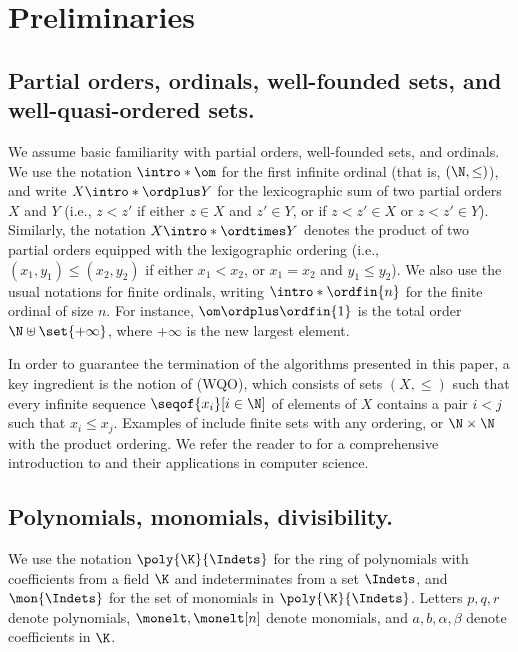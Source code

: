 \section{Preliminaries}
\label{sec:preliminaries}


\subsection{Partial orders, ordinals, well-founded sets, and well-quasi-ordered sets.}
\AP We assume basic familiarity with partial orders, well-founded sets, and ordinals.
We use the notation $\intro*\om$ for the first infinite ordinal (that is, $(\N, \leq)$), and write $X \intro*\ordplus Y$ for the lexicographic sum of two partial orders $X$ and $Y$
(i.e., $z < z'$ if either $z\in X$ and $z'\in Y$, or if $z < z'\in X$ or $z < z'\in Y$).
Similarly, the notation $X\intro*\ordtimes Y$ denotes the product of two partial orders equipped with the lexigographic ordering
(i.e., $(x_1, y_1) \leq (x_2, y_2)$ if either $x_1 < x_2$, or $x_1 = x_2$ and $y_1 \leq y_2$).
We also use the usual notations for finite ordinals, writing $\intro*\ordfin{n}$ for the finite ordinal of size $n$.
For instance, $\om \ordplus \ordfin{1}$ is the total order $\N \uplus\set{+\infty}$, where $+\infty$ is the new largest element.

\AP In order to guarantee the termination of the algorithms presented in this
paper, a key ingredient is the notion of 
(WQO), which consists of sets $(X, \leq)$ such that every infinite sequence
$\seqof{x_i}[i \in \N]$ of elements of $X$ contains a pair $i < j$ such that
$x_i \leq x_j$. Examples of  include finite sets with
any ordering, or $\N \times \N$ with the product ordering. We refer the reader
to \cite{SCSC17} for a comprehensive introduction to 
and their applications in computer science.
%
\subsection{Polynomials, monomials, divisibility.}
\AP We use the notation $\poly{\K}{\Indets}$ for the ring of polynomials with coefficients from a field $\K$ and indeterminates from a set $\Indets$,
and $\mon{\Indets}$ for the set of monomials in $\poly{\K}{\Indets}$.
Letters $p,q,r$ denote polynomials,
$\monelt,\monelt[n]$ denote monomials, and $a,b,\alpha,\beta$ denote coefficients in $\K$.

